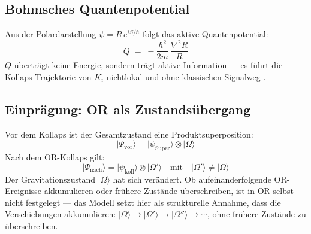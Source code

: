 \documentclass[11pt,a4paper]{article}
\begin{document}
\subsection*{Bohmsches Quantenpotential}

Aus der Polardarstellung $\psi = R\,e^{iS/\hbar}$ folgt das aktive Quantenpotential:
\begin{equation}
  Q \;=\; -\frac{\hbar^2}{2m}\,\frac{\nabla^2 R}{R}
  \label{eq:bohm_Q}
\end{equation}
$Q$ überträgt keine Energie, sondern trägt aktive Information — es führt
die Kollaps-Trajektorie von $K_i$ nichtlokal und ohne klassischen Signalweg
\citep{bohm1980}.

\subsection*{Einprägung: OR als Zustandsübergang}

Vor dem Kollaps ist der Gesamtzustand eine Produktsuperposition:
\begin{equation}
  |\Psi_{\text{vor}}\rangle = |\psi_{\text{Super}}\rangle \otimes |\Omega\rangle
\end{equation}
Nach dem OR-Kollaps gilt:
\begin{equation}
  |\Psi_{\text{nach}}\rangle = |\psi_{\text{koll}}\rangle \otimes |\Omega'\rangle
  \quad\text{mit}\quad |\Omega'\rangle \neq |\Omega\rangle
\end{equation}
Der Gravitationszustand $|\Omega\rangle$ hat sich verändert. Ob aufeinanderfolgende
OR-Ereignisse akkumulieren oder frühere Zustände überschreiben, ist in OR selbst nicht
festgelegt — das Modell setzt hier als strukturelle Annahme, dass die Verschiebungen
akkumulieren: $|\Omega\rangle \to |\Omega'\rangle \to |\Omega''\rangle \to \cdots$,
ohne frühere Zustände zu überschreiben.


\clearpage
{}
\end{document}
